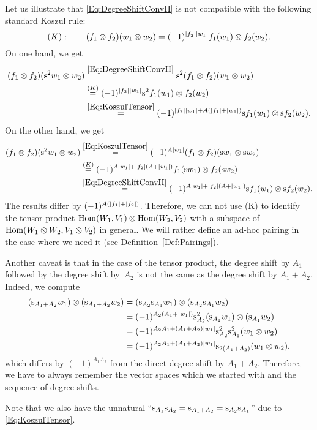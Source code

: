 \documentclass[\MainFolder/Text.tex]{subfiles}
\begin{document}
\begin{Remark}\label{Rem:BadConvention}
Let us illustrate that \eqref{Eq:DegreeShiftConvII} is not compatible with the following standard Koszul rule:
\begin{equation*}
(K):\qquad (f_1 \otimes f_2)(w_1 \otimes w_2) = (-1)^{|f_2||w_1|} f_1(w_1) \otimes f_2(w_2).
\end{equation*}
On one hand, we get 
\[\begin{aligned}
(f_1 \otimes f_2)(\mathrm{s}^2 w_1 \otimes w_2) &\overset{\eqref{Eq:DegreeShiftConvII}}{=} \mathrm{s}^2 (f_1\otimes f_2)(w_1 \otimes w_2) \\
& \overset{(K)}{=} (-1)^{|f_2||w_1|} \mathrm{s}^2 f_1(w_1) \otimes f_2(w_2)  \\
& \overset{\eqref{Eq:KoszulTensor}}{=} (-1)^{|f_2||w_1| + A(|f_1| + |w_1|)} \mathrm{s} f_1(w_1) \otimes \mathrm{s} f_2(w_2).
\end{aligned}\]
On the other hand, we get
\[\begin{aligned}
(f_1 \otimes f_2)(\mathrm{s}^2 w_1 \otimes w_2) &\overset{\eqref{Eq:KoszulTensor}}{=} (-1)^{A|w_1|}(f_1 \otimes f_2)(\mathrm{s} w_1 \otimes \mathrm{s} w_2)\\
&\overset{(K)}{=} (-1)^{A|w_1| + |f_2|(A+|w_1|)} f_1(\mathrm{s} w_1) \otimes f_2(\mathrm{s} w_2)\\ &\overset{\eqref{Eq:DegreeShiftConvII}}{=}(-1)^{A|w_1|+ |f_2|(A+|w_1|)} \mathrm{s} f_1(w_1) \otimes \mathrm{s} f_2(w_2).
\end{aligned}\]
The results differ by $(-1)^{A(|f_1|+|f_2|)}$. Therefore, we can not use (K) to identify the tensor product $\mathrm{Hom}(W_1,V_1)\otimes \mathrm{Hom}(W_2,V_2)$ with a subspace of $\mathrm{Hom}(W_1\otimes W_2, V_1\otimes V_2)$ in general. We will rather define an ad-hoc pairing in the case where we need it (see Definition~\ref{Def:Pairings}).

Another caveat is that in the case of the tensor product, the degree shift by $A_1$ followed by the degree shift by~$A_2$ is not the same as the degree shift by $A_1 + A_2$. Indeed, we compute
\[\begin{aligned}
(\mathrm{s}_{A_1 + A_2}w_1) \otimes (\mathrm{s}_{A_1 + A_2}w_2) &=
(\mathrm{s}_{A_2} \mathrm{s}_{A_1}w_1) \otimes (\mathrm{s}_{A_2}\mathrm{s}_{A_1} w_2) \\ &= (-1)^{A_2(A_1 + |w_1|)}\mathrm{s}_{A_2}^2 (\mathrm{s}_{A_1} w_1) \otimes (\mathrm{s}_{A_1} w_2) \\
&= (-1)^{A_2 A_1 + (A_1 + A_2)|w_1|} \mathrm{s}_{A_2}^2 \mathrm{s}_{A_1}^2 (w_1 \otimes w_2) \\ &= (-1)^{A_2 A_1 + (A_1 + A_2)|w_1|} \mathrm{s}_{2(A_1 + A_2)} (w_1 \otimes w_2),
\end{aligned}\]
which differs by $(-1)^{A_1 A_2}$ from the direct degree shift by $A_1 + A_2$. Therefore, we have to always remember the vector spaces which we started with and the sequence of degree shifts. 

Note that we also have the unnatural ``$\mathrm{s}_{A_1} \mathrm{s}_{A_2} = \mathrm{s}_{A_1 + A_2} = \mathrm{s}_{A_2} \mathrm{s}_{A_1}$'' due to \eqref{Eq:KoszulTensor}.
\end{Remark}
\end{document}
